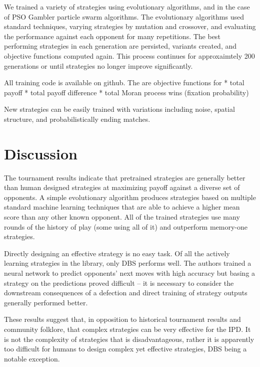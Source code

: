 \documentclass{article}
\begin{document}
We trained a variety of strategies using evolutionary algorithms, and in the
case of PSO Gambler particle swarm algorithms. The evolutionary algorithms
used standard techniques, varying strategies by mutation and crossover, and
evaluating the performance against each opponent for many repetitions. The
best performing strategies in each generation are persisted, variants created,
and objective functions computed again. This process continues for approxaimtely
200 generations or until strategies no longer improve significantly.



All training code is available on github. The are objective functions for
* total payoff
* total payoff difference
* total Moran process wins (fixation probability)

New strategies can be easily trained with variations including noise, spatial
structure, and probabilistically ending matches.

\section{Discussion}

The tournament results indicate that pretrained strategies are generally better
than human designed strategies at maximizing payoff against a diverse set of
opponents. A simple evolutionary algorithm produces strategies based on multiple
standard machine learning techniques that are able to achieve a higher mean
score than any other known opponent. All of the trained strategies use many
rounds of the history of play (some using all of it) and outperform memory-one
strategies.

Directly designing an effective strategy is no easy task. Of all the actively
learning strategies in the library, only DBS performs well. The authors trained
a neural network to predict opponents' next moves with high accuracy but basing
a strategy on the predictions proved difficult -- it is necessary to consider
the downstream consequences of a defection and direct training of strategy
outputs generally performed better.

These results suggest that, in opposition to historical tournament results
and community folklore, that complex strategies can be very effective for the
IPD. It is not the complexity of strategies that is disadvantageous, rather it
is apparently too difficult for humans to design complex yet effective
strategies, DBS being a notable exception.
\end{document}
